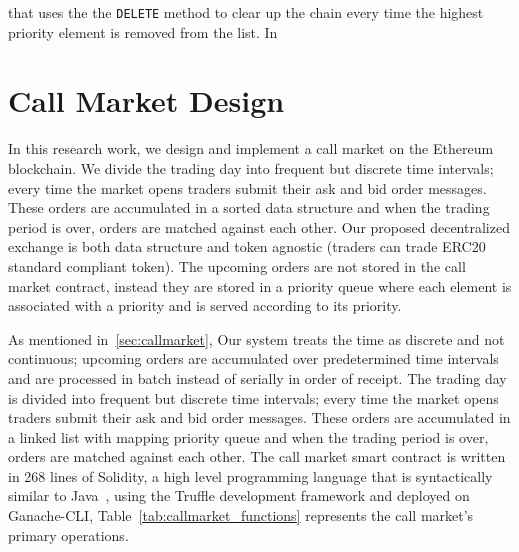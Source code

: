  that uses the  the \texttt{DELETE} method to clear up the chain every time the highest priority element is removed from the list. In 




\section{Call Market Design}



In this research work, we design and implement a call market on the Ethereum blockchain. We divide the trading day into frequent but discrete time intervals; every time the market opens traders submit their ask and bid order messages. These orders are accumulated in a sorted data structure and when the trading period is over, orders are matched against each other. Our proposed decentralized exchange is both data structure and token agnostic (traders can trade ERC20 standard compliant token). The upcoming orders are not stored in the call market contract, instead they are stored in a priority queue where each element is associated with a priority and is served according to its priority.
 
As mentioned in~\ref{sec:callmarket}, Our system treats the time as discrete and not continuous; upcoming orders are accumulated over predetermined time intervals and are processed in batch instead of serially in order of receipt. The trading day is divided into frequent but discrete time intervals; every time the market opens traders submit their ask and bid order messages. These orders are accumulated in a linked list with mapping priority queue and when the trading period is over, orders are matched against each other. The call market smart contract is written in 268 lines of Solidity, a high level programming language that is syntactically similar to Java~\cite{Ethereum41:online}, using the Truffle development framework and deployed on Ganache-CLI, Table~\ref{tab:callmarket_functions} represents the call market's primary operations.

